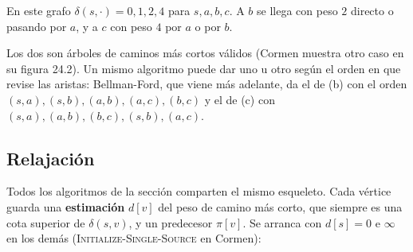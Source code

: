 \documentclass[11pt,letterpaper]{article}
\begin{document}
\begin{ejemplo}
  \label{ej:dos-arboles-fuente}
  En este grafo $\delta(s, \cdot) = 0, 1, 2, 4$ para $s, a, b, c$. A
  $b$ se llega con peso $2$ directo o pasando por $a$, y a $c$ con
  peso $4$ por $a$ o por $b$.
  \begin{center}
  \end{center}
  Los dos son árboles de caminos más cortos válidos (Cormen muestra
  otro caso en su figura 24.2). Un mismo algoritmo puede dar uno u
  otro según el orden en que revise las aristas: Bellman-Ford, que
  viene más adelante, da el de (b) con el orden
  $(s, a), (s, b), (a, b), (a, c), (b, c)$ y el de (c) con
  $(s, a), (a, b), (b, c), (s, b), (a, c)$.
\end{ejemplo}


\subsection*{Relajación}

Todos los algoritmos de la sección comparten el mismo esqueleto. Cada
vértice guarda una \textbf{estimación} $d[v]$ del peso de camino más
corto, que siempre es una cota superior de $\delta(s, v)$, y un
predecesor $\pi[v]$. Se arranca con $d[s] = 0$ e $\infty$ en los
demás (\textsc{Initialize-Single-Source} en Cormen):
\end{document}
